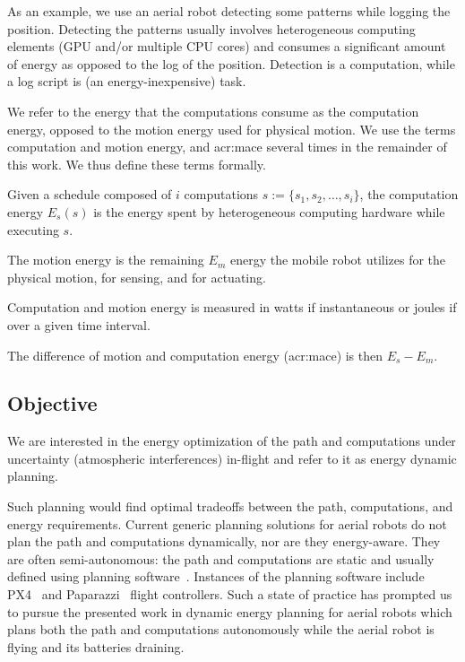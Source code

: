 As an example, we use an aerial robot detecting some patterns while logging the position. Detecting the patterns usually involves heterogeneous computing elements (GPU and/or multiple CPU cores) and consumes a significant amount of energy as opposed to the log of the position. Detection is a computation, while a log script is (an energy-inexpensive) task.

We refer to the energy that the computations consume as the computation energy, opposed to the motion energy used for physical motion. We use the terms computation and motion energy, and \Gls{acr:mace} several times in the remainder of this work. We thus define these terms formally.

\begin{highlight}
\begin{defn}
  Given a schedule composed of $i$ computations $s:=\{s_1,s_2,\dots,s_i\}$, the computation energy $E_s(s)$ is the energy spent by heterogeneous computing hardware while executing $s$.
  
  The motion energy is the remaining $E_m$ energy the mobile robot utilizes for the physical motion, for sensing, and for actuating.
\end{defn}
\end{highlight}

Computation and motion energy is measured in watts if instantaneous or joules if over a given time interval.

\begin{highlight}
  \begin{defn}
    The difference of motion and computation energy (\Gls{acr:mace}) is then $E_s-E_m$.
  \end{defn}
\end{highlight}

\subsection{Objective}

We are interested in the energy optimization of the path and computations under uncertainty (atmospheric interferences) in-flight and refer to it as energy dynamic planning.

Such planning would find optimal tradeoffs between the path, computations, and energy requirements. Current generic planning solutions for aerial robots do not plan the path and computations dynamically, nor are they energy-aware. They are often semi-autonomous: the path and computations are static and usually defined using planning software~\citep{daponte2019review}. Instances of the planning software include PX4~\citep{px4} and Paparazzi~\citep{papa} flight controllers. Such a state of practice has prompted us to pursue the presented work in dynamic energy planning for aerial robots which plans both the path and computations autonomously while the aerial robot is flying and its batteries draining. 

